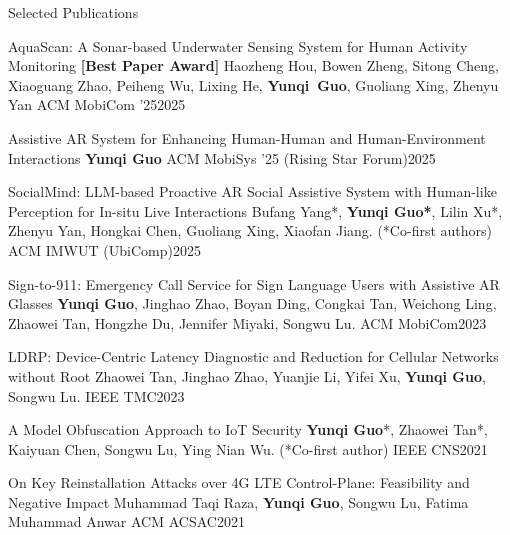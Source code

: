 \documentclass{resume} %
\begin{document}
\begin{rSection}{Selected Publications}

\begin{rPublication}
{AquaScan: A Sonar-based Underwater Sensing System for Human Activity Monitoring \textbf{[Best Paper Award]}}
{Haozheng Hou, Bowen Zheng, Sitong Cheng, Xiaoguang Zhao, Peiheng Wu, Lixing He, \textbf{Yunqi~Guo}, Guoliang Xing, Zhenyu Yan}
{ACM MobiCom '25}{2025}
\end{rPublication}

\begin{rPublication}
{Assistive AR System for Enhancing Human-Human and Human-Environment Interactions}
{\textbf{Yunqi Guo}}
{ACM MobiSys '25 (Rising Star Forum)}{2025}
\end{rPublication}

\begin{rPublication}
{SocialMind: LLM-based Proactive AR Social Assistive System with Human-like Perception for In-situ Live Interactions}
{{Bufang Yang*}, \textbf{Yunqi Guo*}, {Lilin Xu*}, Zhenyu Yan, Hongkai Chen, Guoliang Xing, Xiaofan Jiang. (*Co-first authors)}
{ACM IMWUT (UbiComp)}{2025}
\end{rPublication}

\begin{rPublication}
{Sign-to-911: Emergency Call Service for Sign Language Users with Assistive AR Glasses}
{\textbf{Yunqi Guo}, Jinghao Zhao, Boyan Ding, Congkai Tan, Weichong Ling, Zhaowei Tan, Hongzhe Du, Jennifer Miyaki, Songwu Lu.}
{ACM MobiCom}{2023}
\end{rPublication}

\begin{rPublication}
{LDRP: Device-Centric Latency Diagnostic and Reduction for Cellular Networks without Root}
{Zhaowei Tan, Jinghao Zhao, Yuanjie Li, Yifei Xu, \textbf{Yunqi Guo}, Songwu Lu.}
{IEEE TMC}{2023}
\end{rPublication}

\begin{rPublication}
{A Model Obfuscation Approach to IoT Security}
{\textbf{Yunqi Guo}*, Zhaowei Tan*, Kaiyuan Chen, Songwu Lu, Ying Nian Wu. (*Co-first author)}
{IEEE CNS}{2021}
\end{rPublication}

\begin{rPublication}
{On Key Reinstallation Attacks over 4G LTE Control-Plane: Feasibility and Negative Impact}
{Muhammad Taqi Raza, \textbf{Yunqi Guo}, Songwu Lu, Fatima Muhammad Anwar}
{ACM ACSAC}{2021}
\end{rPublication}


\end{rSection}
\end{document}
